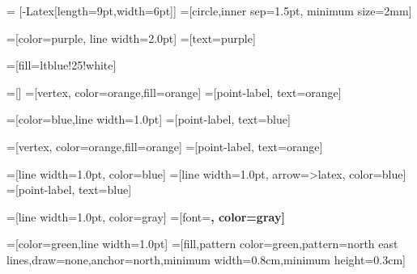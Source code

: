 \usetikzlibrary{positioning,arrows.meta,shapes,calc,patterns}

 = [-{Latex[length=9pt,width=6pt]}]
=[circle,inner sep=1.5pt, minimum size=2mm]

=[color=purple, line width=2.0pt]
=[text=purple]

=[fill=ltblue!25!white]

=[]
=[vertex, color=orange,fill=orange]
=[point-label, text=orange]

=[color=blue,line width=1.0pt]
=[point-label, text=blue]


=[vertex, color=orange,fill=orange]
=[point-label, text=orange]

=[line width=1.0pt, color=blue]
=[line width=1.0pt, arrow=>latex, color=blue]
=[point-label, text=blue]


=[line width=1.0pt, color=gray]
=[font=\bfseries, color=gray]


=[color=green,line width=1.0pt]
=[fill,pattern color=green,pattern=north east lines,draw=none,anchor=north,minimum width=0.8cm,minimum height=0.3cm]
